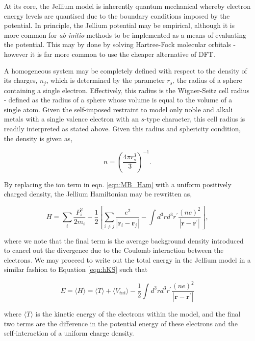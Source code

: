At its core, the Jellium model is inherently quantum mechanical whereby electron energy levels are quantised due to the boundary conditions imposed by the potential. In principle, the Jellium potential may be empirical, although it is more common for \textit{ab initio} methods to be implemented as a means of evaluating the potential. This may by done by solving Hartree-Fock molecular orbitals - however it is far more common to use the cheaper alternative of DFT.

A homogeneous system may be completely defined with respect to the density of its charges, $n_j$, which is determined by the parameter $r_{s}$, the radius of a sphere containing a single electron. Effectively, this radius is the Wigner-Seitz cell radius - defined as the radius of a sphere whose volume is equal to the volume of a single atom. Given the self-imposed restraint to model only noble and alkali metals with a single valence electron with an $s$-type character, this cell radius is readily interpreted as stated above. Given this radius and sphericity condition, the density is given as,

\begin{equation}
    n = \left( \frac{4\pi r^{3}_{s}}{3} \right)^{-1}.
\end{equation}

By replacing the ion term in eqn. \ref{eqn:MB_Ham} with a uniform positively charged density, the Jellium Hamiltonian may be rewritten as,

\begin{equation}
    H = \sum_{i} \frac{ P_{i}^{2} }{2m_{i}} + \frac{1}{2} \left[ \sum_{i \neq j} \frac{e^{2}}{ |\textbf{r}_{i} - \textbf{r}_{j}| } - \int d^{3}rd^{3}r^{\prime} \frac{(ne)^2}{|\textbf{r} - \textbf{r}^{\prime}|} \right],
    \label{eqn:jlm}
\end{equation}

where we note that the final term is the average background density introduced to cancel out the divergence due to the Coulomb interaction between the electrons. We may proceed to write out the total energy in the Jellium model in a similar fashion to Equation \ref{eqn:hKS} such that 

\begin{equation}
    E = \langle H \rangle = \langle T \rangle + \langle V_{int} \rangle - \frac{1}{2} \int d^{3}rd^{3}r^{\prime} \frac{(ne)^2}{|\textbf{r} - \textbf{r}^{\prime}|}
    \label{eqn:jlm_E}
\end{equation}

where $\langle T \rangle$ is the kinetic energy of the electrons within the model, and the final two terms are the difference in the potential energy of these electrons and the self-interaction of a uniform charge density. 

